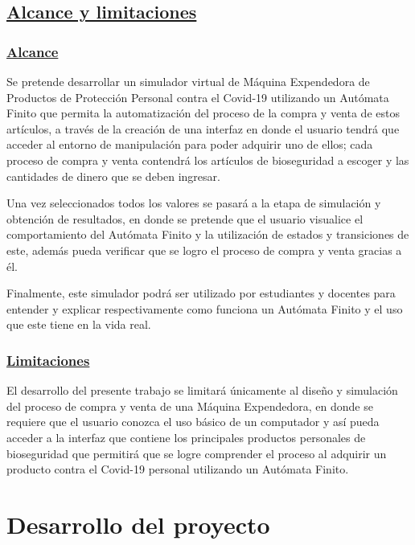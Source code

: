 \documentclass[10pt,conference]{IEEEtran}
\begin{document}
\subsection{\underline{\textbf{Alcance y limitaciones}}}
\subsubsection{\underline{\textbf{Alcance}}}

\par
Se pretende desarrollar un simulador virtual de Máquina Expendedora de Productos de Protección Personal contra el Covid-19 utilizando un Autómata Finito que permita la automatización del proceso de la compra y venta de estos artículos, a través de la creación de una interfaz en donde el usuario tendrá que acceder al entorno de manipulación para poder adquirir uno de ellos; cada proceso de compra y venta contendrá los artículos de bioseguridad a escoger y las cantidades de dinero que se deben ingresar.

Una vez seleccionados todos los valores se pasará a la etapa de simulación y obtención de resultados, en donde se pretende que el usuario visualice el comportamiento del Autómata Finito y la utilización de estados y transiciones de este, además pueda verificar que se logro el proceso de compra y venta gracias a él.

Finalmente, este simulador podrá ser utilizado por estudiantes y docentes para entender y explicar respectivamente como funciona un Autómata Finito y el uso que este tiene en la vida real. 
\subsubsection{\underline{\textbf{Limitaciones}}}

El desarrollo del presente trabajo se limitará únicamente al diseño y simulación del proceso de compra y venta de una Máquina Expendedora, en donde se requiere que el usuario conozca el uso básico de un computador y así pueda acceder a la interfaz que contiene los principales productos personales de bioseguridad que permitirá que se logre comprender el proceso al adquirir un producto contra el Covid-19 personal utilizando un Autómata Finito.
\section{\textbf{Desarrollo del proyecto}}
\end{document}
